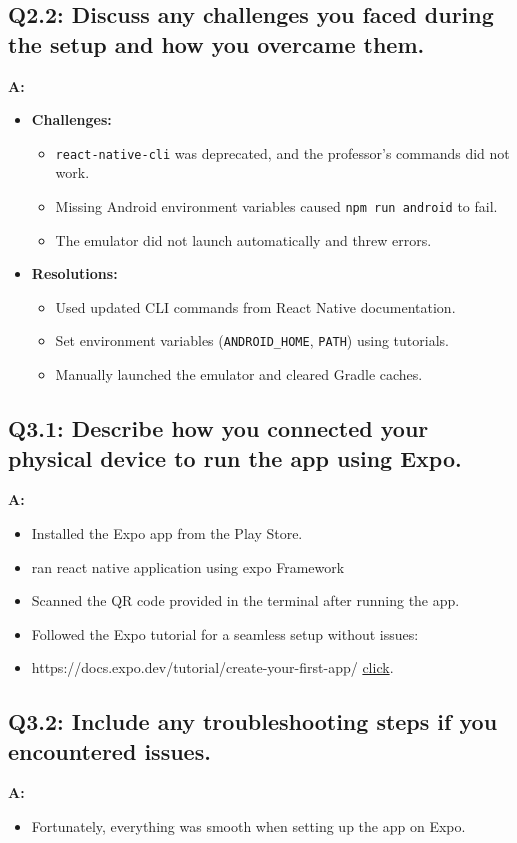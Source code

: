 \documentclass{article}
\begin{document}
\subsection*{Q2.2: Discuss any challenges you faced during the setup and how you overcame them.}
\textbf{A:}
\begin{itemize}
    \item \textbf{Challenges:}
    \begin{itemize}
        \item \texttt{react-native-cli} was deprecated, and the professor's commands did not work.
        \item Missing Android environment variables caused \texttt{npm run android} to fail.
        \item The emulator did not launch automatically and threw errors.
    \end{itemize}
    \item \textbf{Resolutions:}
    \begin{itemize}
        \item Used updated CLI commands from React Native documentation.
        \item Set environment variables (\texttt{ANDROID\_HOME}, \texttt{PATH}) using tutorials.
        \item Manually launched the emulator and cleared Gradle caches.
    \end{itemize}
\end{itemize}

\subsection*{Q3.1: Describe how you connected your physical device to run the app using Expo.}
\textbf{A:}
\begin{itemize}
    \item Installed the Expo app from the Play Store.
    \item ran react native application using expo Framework 
    \item Scanned the QR code provided in the terminal after running the app.
    \item Followed the Expo tutorial for a seamless setup without issues: 
    \item https://docs.expo.dev/tutorial/create-your-first-app/
    \href{https://docs.expo.dev/tutorial/create-your-first-app/}{click}.
\end{itemize}

\subsection*{Q3.2: Include any troubleshooting steps if you encountered issues. }
\textbf{A:}
\begin{itemize}
    \item Fortunately, everything was smooth when setting up the app on Expo.
\end{itemize}
\end{document}
